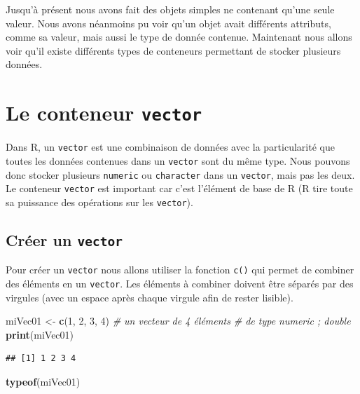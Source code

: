 \documentclass[
]{book}
\newenvironment{Shaded}{\begin{snugshade}}{\end{snugshade}}
\newcommand{\CommentTok}[1]{\textcolor[rgb]{0.56,0.35,0.01}{\textit{#1}}}
\newcommand{\DecValTok}[1]{\textcolor[rgb]{0.00,0.00,0.81}{#1}}
\newcommand{\KeywordTok}[1]{\textcolor[rgb]{0.13,0.29,0.53}{\textbf{#1}}}
\newcommand{\NormalTok}[1]{#1}
\newcommand{\StringTok}[1]{\textcolor[rgb]{0.31,0.60,0.02}{#1}}
\begin{document}
Jusqu'à présent nous avons fait des objets simples ne contenant qu'une seule valeur. Nous avons néanmoins pu voir qu'un objet avait différents attributs, comme sa valeur, mais aussi le type de donnée contenue. Maintenant nous allons voir qu'il existe différents types de conteneurs permettant de stocker plusieurs données.

\hypertarget{l014vector}{%
\section{\texorpdfstring{Le conteneur \texttt{vector}}{Le conteneur vector}}\label{l014vector}}

Dans R, un \texttt{vector} est une combinaison de données avec la particularité que toutes les données contenues dans un \texttt{vector} sont du même type. Nous pouvons donc stocker plusieurs \texttt{numeric} ou \texttt{character} dans un \texttt{vector}, mais pas les deux. Le conteneur \texttt{vector} est important car c'est l'élément de base de R (R tire toute sa puissance des opérations sur les \texttt{vector}).

\hypertarget{cruxe9er-un-vector}{%
\subsection{\texorpdfstring{Créer un \texttt{vector}}{Créer un vector}}\label{cruxe9er-un-vector}}

Pour créer un \texttt{vector} nous allons utiliser la fonction \texttt{c()} qui permet de combiner des éléments en un \texttt{vector}. Les éléments à combiner doivent être séparés par des virgules (avec un espace après chaque virgule afin de rester lisible).

\begin{Shaded}
\begin{Highlighting}[]
\NormalTok{miVec01 <-}\StringTok{ }\KeywordTok{c}\NormalTok{(}\DecValTok{1}\NormalTok{, }\DecValTok{2}\NormalTok{, }\DecValTok{3}\NormalTok{, }\DecValTok{4}\NormalTok{) }\CommentTok{# un vecteur de 4 éléments }
                         \CommentTok{# de type numeric ; double}
\KeywordTok{print}\NormalTok{(miVec01)}
\end{Highlighting}
\end{Shaded}

\begin{verbatim}
## [1] 1 2 3 4
\end{verbatim}

\begin{Shaded}
\begin{Highlighting}[]
\KeywordTok{typeof}\NormalTok{(miVec01)}
\end{Highlighting}
\end{Shaded}
\end{document}
